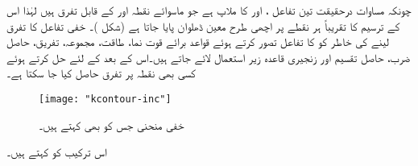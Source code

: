 چونکہ مساوات   درحقیقت تین تفاعل ،  اور  کا ملاپ ہے جو ماسوائے نقطہ  اور  کے قابل تفرق ہیں لہٰذا اس  کے ترسیم کا تقریباً ہر نقطے پر اچھی طرح معین ڈھلوان پایا جاتا ہے  (شکل )۔ خفی تفاعل کا تفرق لینے کی خاطر  کو  کا تفاعل تصور کرتے ہوئے قواعد برائے قوت نما، طاقت، مجموعہ، تفریق، حاصل ضرب، حاصل تقسیم اور زنجیری قاعدہ زیر استعمال لائے جاتے ہیں۔اس کے بعد  کے لئے حل کرتے ہوئے کسی بھی نقطہ  پر تفرق حاصل کیا جا سکتا ہے۔
\begin{figure}
\centering
\texttt{[image: "kcontour-inc"]}
\caption{خفی منحنی  جس کو  بھی کہتے ہیں۔}
\label{شکل_تفرق_خفی_تفاعل_الف}
\end{figure}

اس ترکیب کو  کہتے ہیں۔

